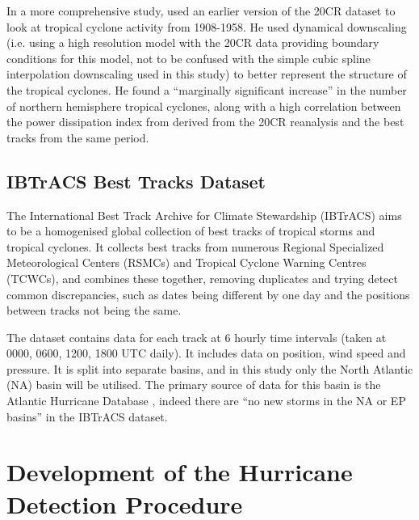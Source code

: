 \documentclass[pdftex,12pt,a4paper]{report}
\begin{document}
In a more comprehensive study, \textcite{emanuel2010tropical} used an earlier version of the 20CR
dataset to look at tropical cyclone activity from 1908-1958. He used dynamical downscaling (i.e.
using a high resolution model with the 20CR data providing boundary conditions for this model, not
to be confused with the simple cubic spline interpolation downscaling used in this study) to better
represent the structure of the tropical cyclones. He found a ``marginally significant increase'' in
the number of northern hemisphere tropical cyclones, along with a high correlation between the power
dissipation index from derived from the 20CR reanalysis and the best tracks from the same period.


\section{IBTrACS Best Tracks Dataset}
\label{sec:ibtracs}
The International Best Track Archive for Climate Stewardship (IBTrACS)
\parencite{knappInternational2010} aims to be a homogenised global collection of best tracks of
tropical storms and tropical cyclones. It collects best tracks from numerous Regional Specialized
Meteorological Centers (RSMCs) and Tropical Cyclone Warning Centres (TCWCs), and combines these
together, removing duplicates and trying detect common discrepancies, such as dates being different
by one day and the positions between tracks not being the same.  

The dataset contains data for each track at 6 hourly time intervals (taken at 0000, 0600, 1200, 1800
UTC daily). It includes data on position, wind speed and pressure. It is split into separate basins,
and in this study only the North Atlantic (NA) basin will be utilised. The primary source of data
for this basin is the Atlantic Hurricane Database \parencite[HURDAT;][]{jarvinen1984tropical}, indeed
there are ``no new storms in the NA or EP basins'' in the IBTrACS dataset. 


\chapter{Development of the Hurricane Detection Procedure}
\label{chap:development}
\end{document}
